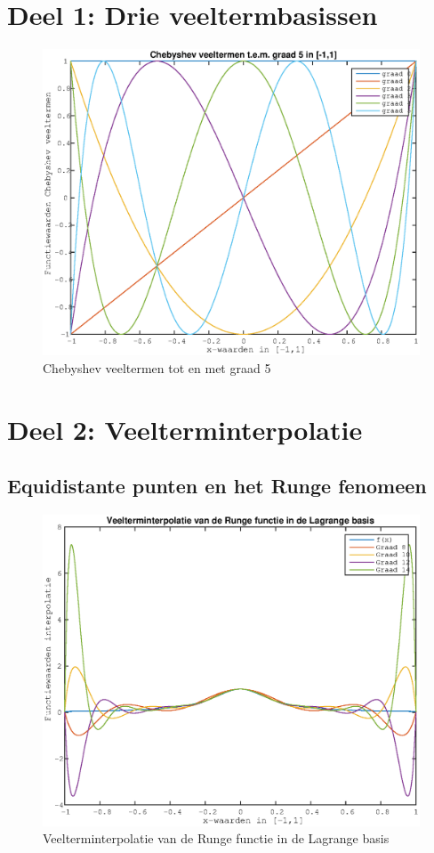 \documentclass{article}
\newcommand{\problemAnswer}[1]{ %
\noindent\framebox[\columnwidth][c]{\begin{minipage}{0.98\columnwidth}#1\end{minipage}} %
}
\begin{document}

\section{Deel 1: Drie veeltermbasissen}

\begin{center}
\begin{figure}[h!]
\includegraphics[width=0.60\columnwidth]{chebyshev_veeltermen}
\caption{Chebyshev veeltermen tot en met graad 5} %
\end{figure}
\end{center}
\clearpage


\section{Deel 2: Veelterminterpolatie}


\subsection{Equidistante punten en het Runge fenomeen}

\begin{center}
\begin{figure}[h!]
\includegraphics[width=0.60\columnwidth]{lagrange_interpolatie}
\caption{Veelterminterpolatie van de Runge functie in de Lagrange basis} %
\end{figure}
\end{center}
\end{document}
